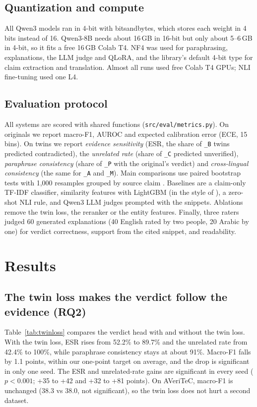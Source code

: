 \documentclass[11pt,a4paper]{article}
\newcommand{\tw}[1]{\texttt{\_#1}}          %
\begin{document}
\subsection{Quantization and compute}
All Qwen3 models ran in 4-bit with bitsandbytes, which stores each weight in 4 bits instead of 16. Qwen3-8B needs about 16\,GB in 16-bit but only about 5--6\,GB in 4-bit, so it fits a free 16\,GB Colab T4. NF4 was used for paraphrasing, explanations, the LLM judge and QLoRA, and the library's default 4-bit type for claim extraction and translation. Almost all runs used free Colab T4 GPUs; NLI fine-tuning used one L4.

\subsection{Evaluation protocol}
All systems are scored with shared functions (\texttt{src/eval/metrics.py}). On originals we report macro-F1, AUROC and expected calibration error (ECE, 15 bins). On twins we report \emph{evidence sensitivity} (ESR, the share of \tw{B} twins predicted contradicted), the \emph{unrelated rate} (share of \tw{C} predicted unverified), \emph{paraphrase consistency} (share of \tw{P} with the original's verdict) and \emph{cross-lingual consistency} (the same for \tw{A} and \tw{M}). Main comparisons use paired bootstrap tests with 1,000 resamples grouped by source claim \citep{efron1993bootstrap}. Baselines are a claim-only TF-IDF classifier, similarity features with LightGBM (in the style of \citet{papadopoulos2025similarity}), a zero-shot NLI rule, and Qwen3 LLM judges prompted with the snippets. Ablations remove the twin loss, the reranker or the entity features. Finally, three raters judged 60 generated explanations (40 English rated by two people, 20 Arabic by one) for verdict correctness, support from the cited snippet, and readability.

\section{Results}

\subsection{The twin loss makes the verdict follow the evidence (RQ2)}
Table~\ref{tab:twinloss} compares the verdict head with and without the twin loss. With the twin loss, ESR rises from 52.2\% to 89.7\% and the unrelated rate from 42.4\% to 100\%, while paraphrase consistency stays at about 91\%. Macro-F1 falls by 1.1 points, within our one-point target on average, and the drop is significant in only one seed. The ESR and unrelated-rate gains are significant in every seed ($p<0.001$; +35 to +42 and +32 to +81 points). On AVeriTeC, macro-F1 is unchanged (38.3 vs 38.0, not significant), so the twin loss does not hurt a second dataset.
\end{document}
